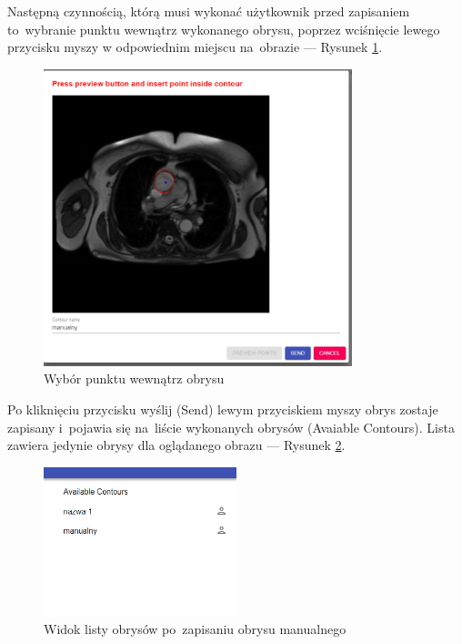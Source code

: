 \documentclass[a4paper,11pt,twoside,openright]{report}
\theoremstyle{definition}
\begin{document}
\begin{enumerate}
Następną czynnością, którą musi wykonać użytkownik przed zapisaniem to~wybranie
punktu wewnątrz wykonanego obrysu, poprzez wciśnięcie lewego przycisku myszy w
odpowiednim miejscu na~obrazie --- Rysunek \ref{fig:8}.


\pagebreak

\begin{figure}[h!]
	\center
	\includegraphics[width=0.8\textwidth]{8}
	\caption{Wybór punktu wewnątrz obrysu}
    	\label{fig:8}
\end{figure}

Po kliknięciu przycisku wyślij (Send) lewym przyciskiem myszy obrys zostaje
zapisany i~pojawia się na~liście wykonanych obrysów (Avaiable Contours). Lista
zawiera jedynie obrysy dla oglądanego obrazu --- Rysunek \ref{fig:9}.

\begin{figure}[h!]
	\center
	\includegraphics[width=0.5\textwidth]{9}
	\caption{Widok listy obrysów po~zapisaniu obrysu manualnego}
    	\label{fig:9}
\end{figure}


\end{enumerate}
\end{document}
